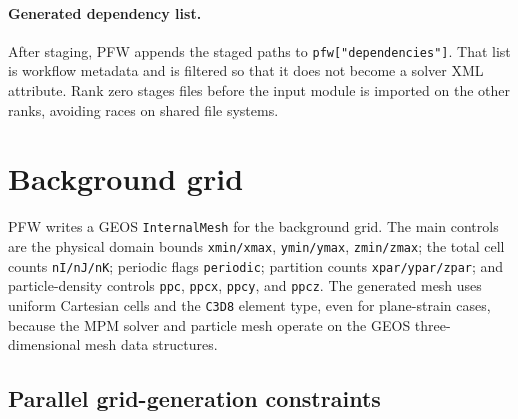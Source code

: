 \paragraph{Generated dependency list.}
After staging, PFW appends the staged paths to \texttt{pfw["dependencies"]}.  That list is workflow metadata and is filtered so that it does not become a solver XML attribute.  Rank zero stages files before the input module is imported on the other ranks, avoiding races on shared file systems.

\section{Background grid}
\label{sec:pfw-background-grid}

PFW writes a GEOS \texttt{InternalMesh} for the background grid.  The main controls are the physical domain bounds \texttt{xmin/xmax}, \texttt{ymin/ymax}, \texttt{zmin/zmax}; the total cell counts \texttt{nI/nJ/nK}; periodic flags \texttt{periodic}; partition counts \texttt{xpar/ypar/zpar}; and particle-density controls \texttt{ppc}, \texttt{ppcx}, \texttt{ppcy}, and \texttt{ppcz}.  The generated mesh uses uniform Cartesian cells and the \texttt{C3D8} element type, even for plane-strain cases, because the MPM solver and particle mesh operate on the GEOS three-dimensional mesh data structures.

\subsection{Parallel grid-generation constraints}

